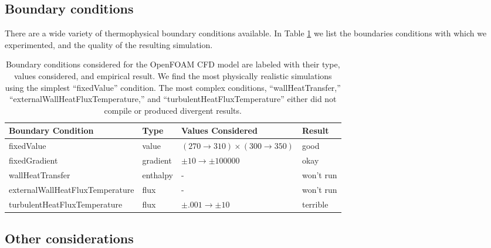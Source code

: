 
\subsection{Boundary conditions}

There are a wide variety of thermophysical boundary conditions available.
In Table \ref{tb:ofbc} we list the boundaries conditions with which we experimented, and the quality of the resulting simulation.

\begin{table}
\begin{tabular}{llll}
\hline
Boundary Condition & Type & Values Considered & Result\\
\hline
\hline
fixedValue & value & $(270 \to 310) \times (300 \to 350)$ & good\\
\hline
fixedGradient & gradient & $\pm 10 \to \pm 100000$ & okay\\
\hline
wallHeatTransfer & enthalpy & - & won't run\\
\hline
externalWallHeatFluxTemperature & flux & - & won't run\\
\hline
turbulentHeatFluxTemperature & flux & $\pm .001 \to \pm10$ & terrible\\
\hline
\end{tabular}
\label{tb:ofbc}
\caption{
  Boundary conditions considered for the OpenFOAM CFD model are labeled with their type, values considered, and empirical result.
  We find the most physically realistic simulations using the simplest ``fixedValue'' condition.
  The most complex conditions, ``wallHeatTransfer,'' ``externalWallHeatFluxTemperature,'' and ``turbulentHeatFluxTemperature'' either did not compile or produced divergent results.
  }
\end{table}

\subsection{Other considerations}
















